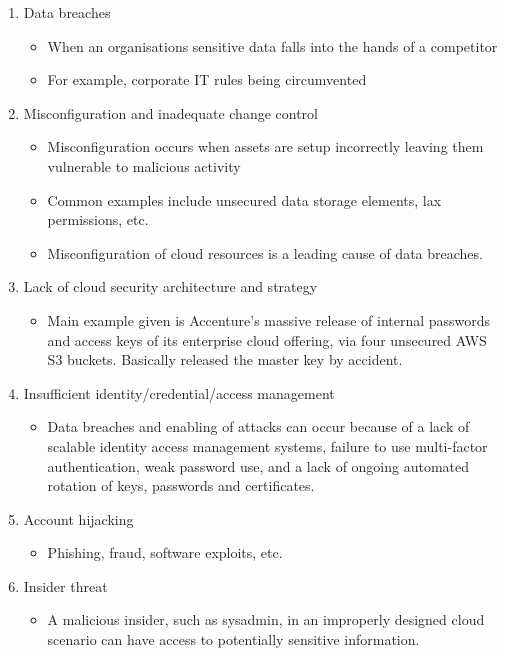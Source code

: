 \documentclass[11pt,a4paper,titlepage,dvipsnames,cmyk]{scrartcl}
\begin{document}
\begin{enumerate}
\item Data breaches
\begin{itemize}
    \item When an organisations sensitive data falls into the hands of a competitor
    \item For example, corporate IT rules being circumvented
\end{itemize}
\item {\color{red}Misconfiguration and inadequate change control}
\begin{itemize}
    \item Misconfiguration occurs when assets are setup incorrectly leaving them vulnerable to malicious activity
    \item Common examples include unsecured data storage elements, lax permissions, etc.
    \item Misconfiguration of cloud resources is a leading cause of data breaches.
\end{itemize}
\item {\color{red}Lack of cloud security architecture and strategy}
\begin{itemize}
    \item Main example given is Accenture's massive release of internal passwords and access keys of its enterprise cloud offering, via four unsecured AWS S3 buckets. Basically released the master key by accident.
\end{itemize}
\item Insufficient identity/credential/access management
\begin{itemize}
    \item Data breaches and enabling of attacks can occur because of a lack of scalable identity access management systems, failure to use multi-factor authentication, weak password use, and a lack of ongoing automated rotation of keys, passwords and certificates.
\end{itemize}
\item Account hijacking
\begin{itemize}
    \item Phishing, fraud, software exploits, etc.
\end{itemize}
\item Insider threat
\begin{itemize}
    \item A malicious insider, such as sysadmin, in an improperly designed cloud scenario can have access to potentially sensitive information.

\end{itemize}
\end{enumerate}
\end{document}
